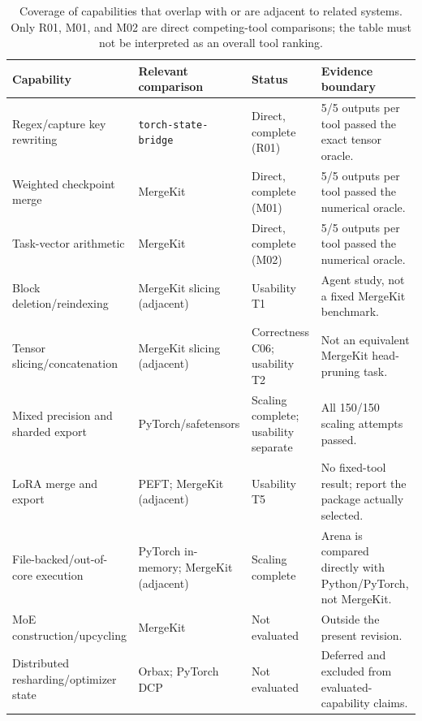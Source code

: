 \begin{table}[t]
  \centering
  \small
  \begin{tabular}{@{}p{}p{}p{}p{}@{}}
    \toprule
    \textbf{Capability} & \textbf{Relevant comparison} & \textbf{Status} & \textbf{Evidence boundary} \\
    \midrule
    Regex/capture key rewriting
      & \texttt{torch-state-bridge}
      & Direct, complete (R01)
      & 5/5 outputs per tool passed the exact tensor oracle. \\
    Weighted checkpoint merge
      & MergeKit
      & Direct, complete (M01)
      & 5/5 outputs per tool passed the numerical oracle. \\
    Task-vector arithmetic
      & MergeKit
      & Direct, complete (M02)
      & 5/5 outputs per tool passed the numerical oracle. \\
    Block deletion/reindexing
      & MergeKit slicing (adjacent)
      & Usability T1
      & Agent study, not a fixed MergeKit benchmark. \\
    Tensor slicing/concatenation
      & MergeKit slicing (adjacent)
      & Correctness C06; usability T2
      & Not an equivalent MergeKit head-pruning task. \\
    Mixed precision and sharded export
      & PyTorch/safetensors
      & Scaling complete; usability separate
      & All 150/150 scaling attempts passed. \\
    LoRA merge and export
      & PEFT; MergeKit (adjacent)
      & Usability T5
      & No fixed-tool result; report the package actually selected. \\
    File-backed/out-of-core execution
      & PyTorch in-memory; MergeKit (adjacent)
      & Scaling complete
      & Arena is compared directly with Python/PyTorch, not MergeKit. \\
    MoE construction/upcycling
      & MergeKit
      & Not evaluated
      & Outside the present revision. \\
    Distributed resharding/optimizer state
      & Orbax; PyTorch DCP
      & Not evaluated
      & Deferred and excluded from evaluated-capability claims. \\
    \bottomrule
  \end{tabular}
  \caption{Coverage of capabilities that overlap with or are adjacent to related systems. Only R01, M01, and M02 are direct competing-tool comparisons; the table must not be interpreted as an overall tool ranking.}
  \label{tab:related-system-feature-coverage}
\end{table}
